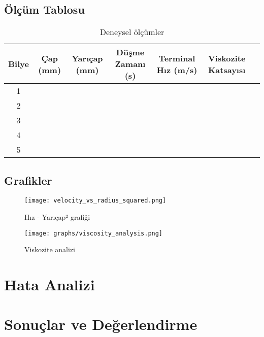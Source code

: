 \documentclass[12pt,a4paper]{article}
\begin{document}
\subsection{Ölçüm Tablosu}
\begin{table}[H]
\centering
\begin{tabular}{|c|c|c|c|c|c|c|}
\hline
Bilye & Çap (mm) & Yarıçap (mm) & Düşme Zamanı (s) & Terminal Hız (m/s) & Viskozite Katsayısı \\
\hline
1 & & & & & \\
2 & & & & & \\
3 & & & & & \\
4 & & & & & \\
5 & & & & & \\
\hline
\end{tabular}
\caption{Deneysel ölçümler}
\end{table}

\subsection{Grafikler}
\begin{figure}[H]
\centering
\texttt{[image: velocity\_vs\_radius\_squared.png]}
\caption{Hız - Yarıçap² grafiği}
\end{figure}

\begin{figure}[H]
\centering
\texttt{[image: graphs/viscosity\_analysis.png]}
\caption{Viskozite analizi}
\end{figure}

\section{Hata Analizi}

\section{Sonuçlar ve Değerlendirme}
\end{document}
